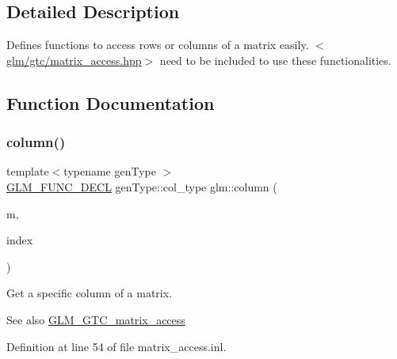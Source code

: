 \subsection{Detailed Description}
Defines functions to access rows or columns of a matrix easily. $<$\mbox{\hyperlink{matrix__access_8hpp}{glm/gtc/matrix\+\_\+access.\+hpp}}$>$ need to be included to use these functionalities. 

\subsection{Function Documentation}
\mbox{\label{group__gtc__matrix__access_ga96022eb0d3fae39d89fc7a954e59b374}} 
\subsubsection{\texorpdfstring{column()}{column()}\hspace{0.1cm}{\footnotesize\ttfamily [1/2]}}
{\footnotesize\ttfamily template$<$typename gen\+Type $>$ \\
\mbox{\hyperlink{setup_8hpp_ab2d052de21a70539923e9bcbf6e83a51}{G\+L\+M\+\_\+\+F\+U\+N\+C\+\_\+\+D\+E\+CL}} gen\+Type\+::col\+\_\+type glm\+::column (\begin{DoxyParamCaption}\item[{gen\+Type const \&}]{m,  }\item[{\mbox{\hyperlink{namespaceglm_a090a0de2260835bee80e71a702492ed9}{length\+\_\+t}}}]{index }\end{DoxyParamCaption})}

Get a specific column of a matrix. \begin{DoxySeeAlso}{See also}
\mbox{\hyperlink{group__gtc__matrix__access}{G\+L\+M\+\_\+\+G\+T\+C\+\_\+matrix\+\_\+access}} 
\end{DoxySeeAlso}


Definition at line 54 of file matrix\+\_\+access.\+inl.

\mbox{\label{group__gtc__matrix__access_ga9e757377523890e8b80c5843dbe4dd15}} 
